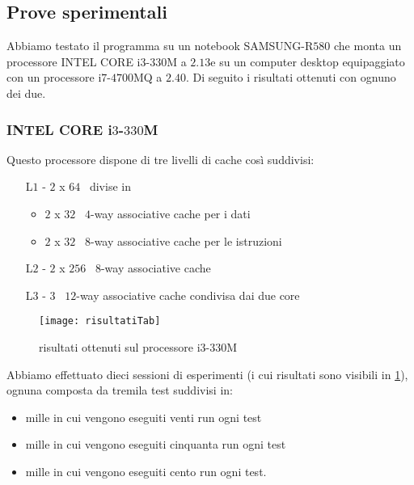			\subsection{Prove sperimentali}
				Abbiamo testato il programma su un notebook SAMSUNG-R$580$ che monta un processore INTEL CORE i$3$-$330$M a $2.13$\gigahertz e su un computer desktop equipaggiato con un processore i$7$-$4700$MQ a $2.40$\gigahertz. Di seguito i risultati ottenuti con ognuno dei due.
				
				\subsubsection*{INTEL CORE i$3$-$330$M} 
				
					Questo processore dispone di tre livelli di cache così suddivisi:
					
					\begin{itemize}
						\item [L$1$ -] $2$ x $64$ \kilobyte \ divise in 
						\begin{itemize}
							\item  $2$ x $32$ \kilobyte \ $4$-way associative cache per i dati
							\item  $2$ x $32$ \kilobyte \ $8$-way associative cache per le istruzioni
						\end{itemize}
						\item[L$2$ -] $2$ x $256$ \kilobyte \ $8$-way associative cache
						\item[L$3$ -] $3$ \megabyte \ $12$-way associative cache condivisa dai due core
					\end{itemize}
				
					\begin{figure}
						\begin{center}
							\texttt{[image: risultatiTab]}
							\caption{risultati ottenuti sul processore i$3$-$330$M}
							\label{fig:risultati}
						\end{center}
					\end{figure}
				
					Abbiamo effettuato dieci sessioni di esperimenti (i cui risultati sono visibili in \cref{fig:risultati}), ognuna composta da tremila test suddivisi in:
					
					\begin{itemize}
						\item mille in cui vengono eseguiti venti run ogni test
						\item mille in cui vengono eseguiti cinquanta run ogni test
						\item mille in cui vengono eseguiti cento run ogni test.
					\end{itemize}
					
